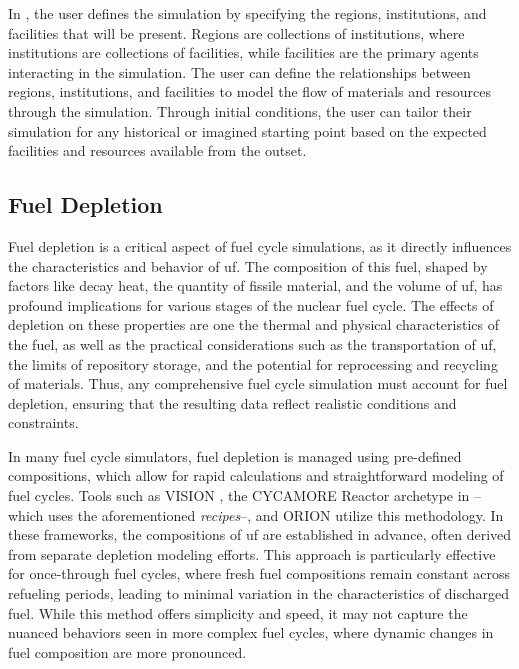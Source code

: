 
In \cyclus, the user defines the simulation by specifying the regions,
institutions, and facilities that will be present. Regions
are collections of institutions, where institutions are collections of
facilities, while facilities are the primary agents interacting in the
simulation. The user can define the relationships between regions,
institutions, and facilities to model the flow of materials and resources
through the simulation. Through initial conditions, the user can tailor their
simulation for any historical or imagined starting point based on the expected
facilities and resources available from the outset.

\subsection{Fuel Depletion}
\label{sec:depletion}

Fuel depletion is a critical aspect of fuel cycle simulations, as it directly
influences the characteristics and behavior of \gls{uf}. The composition of
this fuel, shaped by factors like decay heat, the quantity of fissile material,
and the volume of \gls{uf}, has profound implications for various stages of the
nuclear fuel cycle. The effects of depletion on these properties are one the
thermal and physical characteristics of the fuel, as well as the practical
considerations such as the transportation of \gls{uf}, the limits of repository
storage, and the potential for reprocessing and recycling of materials. Thus,
any comprehensive fuel cycle simulation must account for fuel depletion,
ensuring that the resulting data reflect realistic conditions and constraints.

In many fuel cycle simulators, fuel depletion is managed using pre-defined
compositions, which allow for rapid calculations and straightforward modeling
of fuel cycles. Tools such as VISION \cite{yacout_visionverifiable_2006}, the
CYCAMORE Reactor archetype in \cyclus--which uses the aforementioned
\textit{recipes}--, and ORION utilize this methodology. In these frameworks, the
compositions of \gls{uf} are established in advance, often derived from
separate depletion modeling efforts. This approach is particularly effective
for once-through fuel cycles, where fresh fuel compositions remain constant
across refueling periods, leading to minimal variation in the characteristics
of discharged fuel. While this method offers simplicity and speed, it may not
capture the nuanced behaviors seen in more complex fuel cycles, where dynamic
changes in fuel composition are more pronounced.

